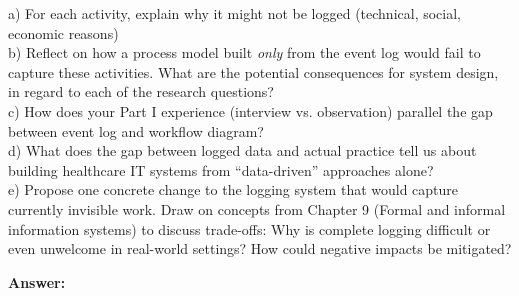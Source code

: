 a) For each activity, explain why it might not be logged (technical, social, economic reasons)\\
b) Reflect on how a process model built \emph{only} from the event log would fail to capture these activities. What are the potential consequences for system design, in regard to each of the research questions?\\
c) How does your Part I experience (interview vs. observation) parallel the gap between event log and workflow diagram?\\
d) What does the gap between logged data and actual practice tell us about building healthcare IT systems from ``data-driven'' approaches alone?\\
e) Propose one concrete change to the logging system that would capture currently invisible work. Draw on concepts from Chapter 9 (Formal and informal information systems) to discuss trade-offs: Why is complete logging difficult or even unwelcome in real-world settings? How could negative impacts be mitigated?

\textbf{Answer:}
